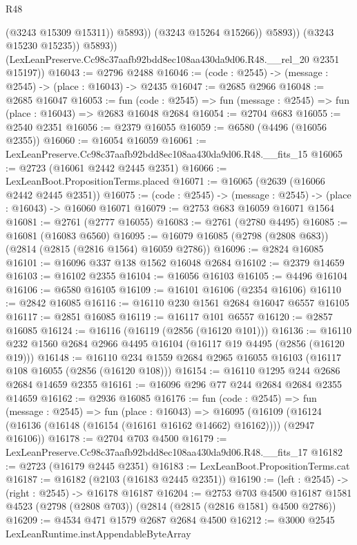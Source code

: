 \begin{lexlean}{R48}
\begin{coremodule}
                        (@3243 @15309 @15311))
                      @5893))
                  (@3243 @15264 @15266))
                @5893))
            (@3243 @15230 @15235))
          @5893))
      (LexLeanPreserve.Cc98c37aafb92bdd8ec108aa430da9d06.R48.__rel_20 @2351 @15197))
@16043 := @2796 @2488
@16046 := (code : @2545) -> (message : @2545) -> (place : @16043) -> @2435
@16047 := @2685 @2966
@16048 := @2685 @16047
@16053 := fun (code : @2545) => fun (message : @2545) => fun (place : @16043) => @2683 @16048 @2684
@16054 := @2704 @683
@16055 := @2540 @2351
@16056 := @2379 @16055
@16059 := @6580 (@4496 (@16056 @2355))
@16060 := @16054 @16059
@16061 := LexLeanPreserve.Cc98c37aafb92bdd8ec108aa430da9d06.R48.__fits_15
@16065 := @2723 (@16061 @2442 @2445 @2351)
@16066 := LexLeanBoot.PropositionTerms.placed
@16071 := @16065 (@2639 (@16066 @2442 @2445 @2351))
@16075 := (code : @2545) -> (message : @2545) -> (place : @16043) -> @16060 @16071
@16079 := @2753 @683 @16059 @16071 @1564
@16081 := @2761 (@2777 @16055)
@16083 := @2761 (@2780 @4495)
@16085 := @16081 (@16083 @6560)
@16095 := @16079 @16085 (@2798 (@2808 @683)) (@2814 (@2815 (@2816 @1564) @16059 @2786))
@16096 := @2824 @16085
@16101 := @16096 @337 @138 @1562 @16048 @2684
@16102 := @2379 @14659
@16103 := @16102 @2355
@16104 := @16056 @16103
@16105 := @4496 @16104
@16106 := @6580 @16105
@16109 := @16101 @16106 (@2354 @16106)
@16110 := @2842 @16085
@16116 := @16110 @230 @1561 @2684 @16047 @6557 @16105
@16117 := @2851 @16085
@16119 := @16117 @101 @6557
@16120 := @2857 @16085
@16124 := @16116 (@16119 (@2856 (@16120 @101)))
@16136 := @16110 @232 @1560 @2684 @2966 @4495 @16104 (@16117 @19 @4495 (@2856 (@16120 @19)))
@16148 := @16110 @234 @1559 @2684 @2965 @16055 @16103 (@16117 @108 @16055 (@2856 (@16120 @108)))
@16154 := @16110 @1295 @244 @2686 @2684 @14659 @2355
@16161 := @16096 @296 @77 @244 @2684 @2684 @2355 @14659
@16162 := @2936 @16085
@16176 := fun (code : @2545) =>
  fun (message : @2545) =>
  fun (place : @16043) =>
  @16095 (@16109 (@16124 (@16136 (@16148 (@16154 (@16161 @16162 @14662) @16162)))) (@2947 @16106))
@16178 := @2704 @703 @4500
@16179 := LexLeanPreserve.Cc98c37aafb92bdd8ec108aa430da9d06.R48.__fits_17
@16182 := @2723 (@16179 @2445 @2351)
@16183 := LexLeanBoot.PropositionTerms.cat
@16187 := @16182 (@2103 (@16183 @2445 @2351))
@16190 := (left : @2545) -> (right : @2545) -> @16178 @16187
@16204 := @2753
    @703
    @4500
    @16187
    @1581
    @4523
    (@2798 (@2808 @703))
    (@2814 (@2815 (@2816 @1581) @4500 @2786))
@16209 := @4534 @471 @1579 @2687 @2684 @4500
@16212 := @3000 @2545 LexLeanRuntime.instAppendableByteArray

\end{coremodule}
\end{lexlean}
